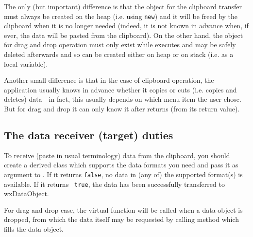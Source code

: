 The only (but important) difference is that the object for the clipboard
transfer must always be created on the heap (i.e. using {\tt new}) and it will
be freed by the clipboard when it is no longer needed (indeed, it is not known
in advance when, if ever, the data will be pasted from the clipboard). On the
other hand, the object for drag and drop operation must only exist while 
 executes and may be safely deleted
afterwards and so can be created either on heap or on stack (i.e. as a local
variable).

Another small difference is that in the case of clipboard operation, the
application usually knows in advance whether it copies or cuts (i.e. copies and
deletes) data - in fact, this usually depends on which menu item the user
chose. But for drag and drop it can only know it after 
 returns (from its return value).

\subsection{The data receiver (target) duties}\label{wxdataobjecttarget}

To receive (paste in usual terminology) data from the clipboard, you should
create a  derived class which supports the
data formats you need and pass it as argument to 
. If it returns {\tt false},
no data in (any of) the supported format(s) is available. If it returns {\tt
true}, the data has been successfully transferred to wxDataObject.

For drag and drop case, the  
virtual function will be called when a data object is dropped, from which the
data itself may be requested by calling 
 method which fills
the data object.

